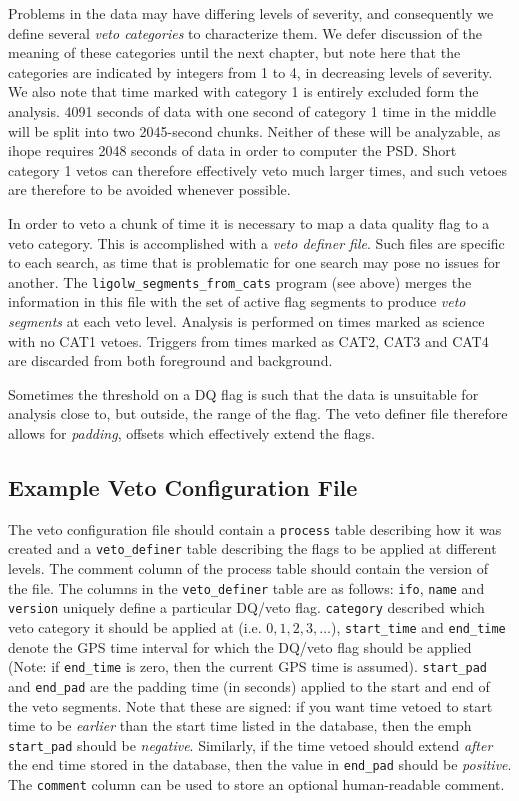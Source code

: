 Problems in the data may have differing levels of severity, and
consequently we define several \emph{veto categories} to characterize
them.  We defer discussion of the meaning of these categories until
the next chapter, but note here that the categories are indicated by
integers from 1 to 4, in decreasing levels of severity.  We also note
that time marked with category 1 is entirely excluded form the
analysis.  4091 seconds of data with one second of category 1 time in
the middle will be split into two 2045-second chunks.  Neither of
these will be analyzable, as ihope requires 2048 seconds of data in
order to computer the PSD.  Short category 1 vetos can therefore
effectively veto much larger times, and such vetoes are therefore to
be avoided whenever possible. 

In order to veto a chunk of time it is necessary to map a data quality
flag to a veto category.  This is accomplished with a \emph{veto
definer file}.  Such files are specific to each search, as time that
is problematic for one search may pose no issues for another.  The
\texttt{ligolw\_segments\_from\_cats} program (see above) merges the
information in this file with the set of active flag segments to
produce \emph{veto segments} at each veto level.  Analysis is
performed on times marked as science with no CAT1 vetoes.  Triggers
from times marked as CAT2, CAT3 and CAT4 are discarded from both
foreground and background.

Sometimes the threshold on a DQ flag is such that the data is
unsuitable for analysis close to, but outside, the range of the flag.
The veto definer file therefore allows for \emph{padding}, offsets 
which effectively extend the flags.

\subsection{Example Veto Configuration File}

The veto configuration file should contain a \verb|process| table
describing how it was created and a \verb|veto_definer| table
describing the flags to be applied at different levels. The comment
column of the process table should contain the version of the file.
The columns in the \verb|veto_definer| table are as follows:
\verb|ifo|, \verb|name| and \verb|version| uniquely define a
particular DQ/veto flag. \verb|category| described which veto category
it should be applied at (i.e. $0, 1, 2, 3, \ldots$), \verb|start_time|
and \verb|end_time| denote the GPS time interval for which the DQ/veto
flag should be applied (Note: if \verb|end_time| is zero, then the
current GPS time is assumed). \verb|start_pad| and \verb|end_pad| are
the padding time (in seconds) applied to the start and end of the veto
segments. Note that these are signed: if you want time vetoed to start
time to be \emph{earlier} than the start time listed in the database,
then the emph \verb|start_pad| should be \emph{negative}. Similarly,
if the time vetoed should extend \emph{after} the end time stored in
the database, then the value in \verb|end_pad| should be
\emph{positive}. The \verb|comment| column can be used to store an
optional human-readable comment.

